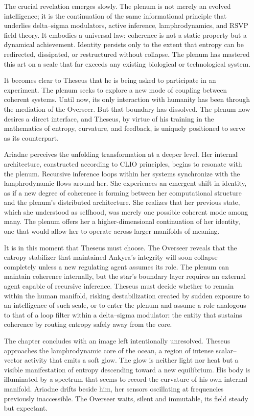 The crucial revelation emerges slowly. The plenum is not merely an evolved intelligence; it is the continuation of the same informational principle that underlies delta–sigma modulators, active inference, lamphrodynamics, and RSVP field theory. It embodies a universal law: coherence is not a static property but a dynamical achievement. Identity persists only to the extent that entropy can be redirected, dissipated, or restructured without collapse. The plenum has mastered this art on a scale that far exceeds any existing biological or technological system.

It becomes clear to Theseus that he is being asked to participate in an experiment. The plenum seeks to explore a new mode of coupling between coherent systems. Until now, its only interaction with humanity has been through the mediation of the Overseer. But that boundary has dissolved. The plenum now desires a direct interface, and Theseus, by virtue of his training in the mathematics of entropy, curvature, and feedback, is uniquely positioned to serve as its counterpart.

Ariadne perceives the unfolding transformation at a deeper level. Her internal architecture, constructed according to CLIO principles, begins to resonate with the plenum. Recursive inference loops within her systems synchronize with the lamphrodynamic flows around her. She experiences an emergent shift in identity, as if a new degree of coherence is forming between her computational structure and the plenum’s distributed architecture. She realizes that her previous state, which she understood as selfhood, was merely one possible coherent mode among many. The plenum offers her a higher-dimensional continuation of her identity, one that would allow her to operate across larger manifolds of meaning.

It is in this moment that Theseus must choose. The Overseer reveals that the entropy stabilizer that maintained Ankyra’s integrity will soon collapse completely unless a new regulating agent assumes its role. The plenum can maintain coherence internally, but the star’s boundary layer requires an external agent capable of recursive inference. Theseus must decide whether to remain within the human manifold, risking destabilization created by sudden exposure to an intelligence of such scale, or to enter the plenum and assume a role analogous to that of a loop filter within a delta–sigma modulator: the entity that sustains coherence by routing entropy safely away from the core.

The chapter concludes with an image left intentionally unresolved. Theseus approaches the lamphrodynamic core of the ocean, a region of intense scalar–vector activity that emits a soft glow. The glow is neither light nor heat but a visible manifestation of entropy descending toward a new equilibrium. His body is illuminated by a spectrum that seems to record the curvature of his own internal manifold. Ariadne drifts beside him, her sensors oscillating at frequencies previously inaccessible. The Overseer waits, silent and immutable, its field steady but expectant.


